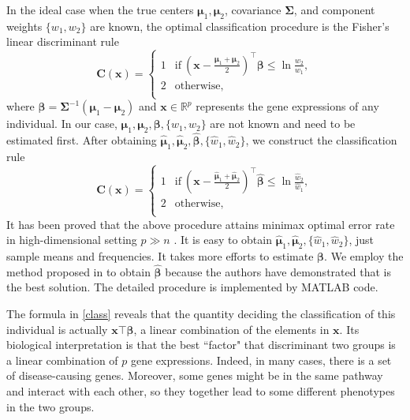 \documentclass{article}
\numberwithin{equation}{section}
\begin{document}
In the ideal case when the true centers $\boldsymbol{\mu}_1, \boldsymbol{\mu}_2$, covariance $\boldsymbol{\Sigma}$, and component weights $\{w_1, w_2\}$ are known, the optimal classification procedure is the Fisher's linear discriminant rule
\begin{equation}\label{class}
    \mathbf{C} (\boldsymbol{x}) = 
    \left\{
    \begin{array}{ccc}
         1 & \text{if} \ (\boldsymbol{x}-\frac{\boldsymbol{\mu}_1 + \boldsymbol{\mu}_2}{2})^\top \boldsymbol{\beta} \leq \ln{\frac{w_2}{w_1}}, \\
         2 & \text{otherwise}, \\
    \end{array}
    \right.
\end{equation}
where $\boldsymbol{\beta}=\boldsymbol{\Sigma}^{-1}(\boldsymbol{\mu}_1 - \boldsymbol{\mu}_2)$ and $\boldsymbol{x}\in\mathbb{R}^p$ represents the gene expressions of any individual. 
In our case, $\boldsymbol{\mu}_1, \boldsymbol{\mu}_2, \boldsymbol{\beta}, \{w_1, w_2\}$ are not known and need to be estimated first. After obtaining $\hat{\boldsymbol{\mu}}_1, \hat{\boldsymbol{\mu}}_2, \hat{\boldsymbol{\beta}}, \{\hat{w}_1, \hat{w}_2\}$, we construct the classification rule
\begin{equation*}
    \mathbf{C} (\boldsymbol{x}) = 
    \left\{
    \begin{array}{ccc}
         1 & \text{if} \ (\boldsymbol{x}-\frac{\hat{\boldsymbol{\mu}}_1 + \hat{\boldsymbol{\mu}}_2}{2})^\top \hat{\boldsymbol{\beta}} \leq \ln{\frac{\hat{w}_2}{\hat{w}_1}}, \\
         2 & \text{otherwise}, \\
    \end{array}
    \right.
\end{equation*}
It has been proved that the above procedure attains minimax optimal error rate in high-dimensional setting $p\gg n$ \citep{cai2019chime}. 
It is easy to obtain $\hat{\boldsymbol{\mu}}_1, \hat{\boldsymbol{\mu}}_2, \{\hat{w}_1, \hat{w}_2\}$, just sample means and frequencies.
It takes more efforts to estimate $\boldsymbol{\beta}$.
We employ the method proposed in \citep{cai2019chime} to obtain $\hat{\boldsymbol{\beta}}$ because the authors have demonstrated that is the best solution. 
The detailed procedure is implemented by MATLAB code. 

The formula in \eqref{class} reveals that the quantity deciding the classification of this individual is actually $\boldsymbol{x}\top\boldsymbol{\beta}$, a linear combination of the elements in $\boldsymbol{x}$. Its biological interpretation is that the best ``factor" that discriminant two groups is a linear combination of $p$ gene expressions. Indeed, in many cases, there is a set of disease-causing genes. Moreover, some genes might be in the same pathway and interact with each other, so they together lead to some different phenotypes in the two groups. 
\end{document}
